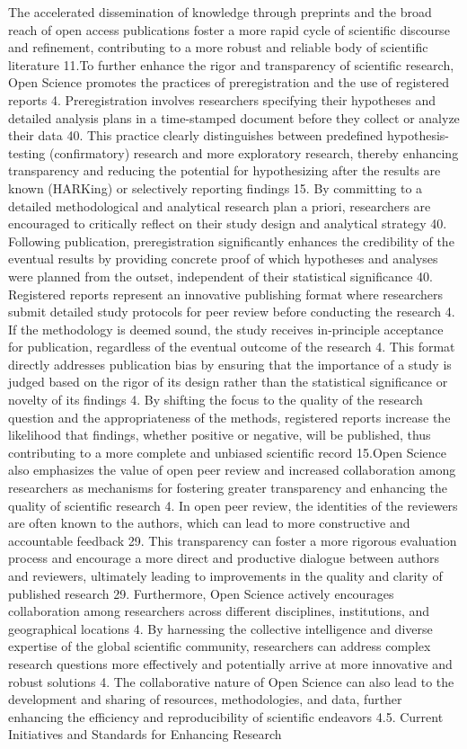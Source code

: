 \documentclass{article}
\begin{document}
The accelerated dissemination of knowledge through preprints and the broad reach of open access publications foster a more rapid cycle of scientific discourse and refinement, contributing to a more robust and reliable body of scientific literature 11.To further enhance the rigor and transparency of scientific research, Open Science promotes the practices of preregistration and the use of registered reports 4. Preregistration involves researchers specifying their hypotheses and detailed analysis plans in a time-stamped document before they collect or analyze their data 40. This practice clearly distinguishes between predefined hypothesis-testing (confirmatory) research and more exploratory research, thereby enhancing transparency and reducing the potential for hypothesizing after the results are known (HARKing) or selectively reporting findings 15. By committing to a detailed methodological and analytical research plan a priori, researchers are encouraged to critically reflect on their study design and analytical strategy 40. Following publication, preregistration significantly enhances the credibility of the eventual results by providing concrete proof of which hypotheses and analyses were planned from the outset, independent of their statistical significance 40. Registered reports represent an innovative publishing format where researchers submit detailed study protocols for peer review before conducting the research 4. If the methodology is deemed sound, the study receives in-principle acceptance for publication, regardless of the eventual outcome of the research 4. This format directly addresses publication bias by ensuring that the importance of a study is judged based on the rigor of its design rather than the statistical significance or novelty of its findings 4. By shifting the focus to the quality of the research question and the appropriateness of the methods, registered reports increase the likelihood that findings, whether positive or negative, will be published, thus contributing to a more complete and unbiased scientific record 15.Open Science also emphasizes the value of open peer review and increased collaboration among researchers as mechanisms for fostering greater transparency and enhancing the quality of scientific research 4. In open peer review, the identities of the reviewers are often known to the authors, which can lead to more constructive and accountable feedback 29. This transparency can foster a more rigorous evaluation process and encourage a more direct and productive dialogue between authors and reviewers, ultimately leading to improvements in the quality and clarity of published research 29. Furthermore, Open Science actively encourages collaboration among researchers across different disciplines, institutions, and geographical locations 4. By harnessing the collective intelligence and diverse expertise of the global scientific community, researchers can address complex research questions more effectively and potentially arrive at more innovative and robust solutions 4. The collaborative nature of Open Science can also lead to the development and sharing of resources, methodologies, and data, further enhancing the efficiency and reproducibility of scientific endeavors 4.5. Current Initiatives and Standards for Enhancing Research 
\end{document}
